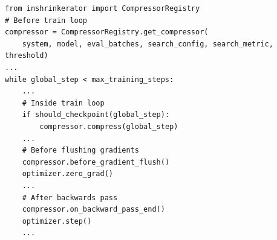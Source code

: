\begin{lstlisting}[style=PyStyle,caption={\small \sys API usage with native Pytorch applications},label={lst:code-torch},]
from inshrinkerator import CompressorRegistry
# Before train loop
compressor = CompressorRegistry.get_compressor(
    system, model, eval_batches, search_config, search_metric, threshold)
...
while global_step < max_training_steps:
    ...
    # Inside train loop 
    if should_checkpoint(global_step):
        compressor.compress(global_step)
    ...
    # Before flushing gradients
    compressor.before_gradient_flush()
    optimizer.zero_grad()
    ...
    # After backwards pass
    compressor.on_backward_pass_end()
    optimizer.step()
    ...   
\end{lstlisting}
